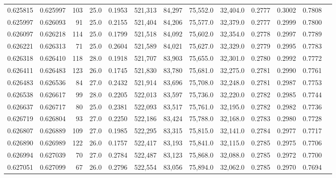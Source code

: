 \begin{tabular}{rrrrrrrrrrrrr}
0.625815 & 0.625997 &   103 & 25.0 &                                     0.1953 & 521,313 &  84,297 &  75,552.0 &  32,404.0 & 0.2777 & 0.3002 & 0.7808 \\
0.625997 & 0.626093 &    91 & 25.0 &                                     0.2155 & 521,404 &  84,206 &  75,577.0 &  32,379.0 & 0.2777 & 0.2999 & 0.7800 \\
0.626097 & 0.626218 &   114 & 25.0 &                                     0.1799 & 521,518 &  84,092 &  75,602.0 &  32,354.0 & 0.2778 & 0.2997 & 0.7789 \\
0.626221 & 0.626313 &    71 & 25.0 &                                     0.2604 & 521,589 &  84,021 &  75,627.0 &  32,329.0 & 0.2779 & 0.2995 & 0.7783 \\
0.626318 & 0.626410 &   118 & 28.0 &                                     0.1918 & 521,707 &  83,903 &  75,655.0 &  32,301.0 & 0.2780 & 0.2992 & 0.7772 \\
0.626411 & 0.626483 &   123 & 26.0 &                                     0.1745 & 521,830 &  83,780 &  75,681.0 &  32,275.0 & 0.2781 & 0.2990 & 0.7761 \\
0.626483 & 0.626536 &    84 & 27.0 &                                     0.2432 & 521,914 &  83,696 &  75,708.0 &  32,248.0 & 0.2781 & 0.2987 & 0.7753 \\
0.626538 & 0.626617 &    99 & 28.0 &                                     0.2205 & 522,013 &  83,597 &  75,736.0 &  32,220.0 & 0.2782 & 0.2985 & 0.7744 \\
0.626637 & 0.626717 &    80 & 25.0 &                                     0.2381 & 522,093 &  83,517 &  75,761.0 &  32,195.0 & 0.2782 & 0.2982 & 0.7736 \\
0.626719 & 0.626804 &    93 & 27.0 &                                     0.2250 & 522,186 &  83,424 &  75,788.0 &  32,168.0 & 0.2783 & 0.2980 & 0.7728 \\
0.626807 & 0.626889 &   109 & 27.0 &                                     0.1985 & 522,295 &  83,315 &  75,815.0 &  32,141.0 & 0.2784 & 0.2977 & 0.7717 \\
0.626890 & 0.626989 &   122 & 26.0 &                                     0.1757 & 522,417 &  83,193 &  75,841.0 &  32,115.0 & 0.2785 & 0.2975 & 0.7706 \\
0.626994 & 0.627039 &    70 & 27.0 &                                     0.2784 & 522,487 &  83,123 &  75,868.0 &  32,088.0 & 0.2785 & 0.2972 & 0.7700 \\
0.627051 & 0.627099 &    67 & 26.0 &                                     0.2796 & 522,554 &  83,056 &  75,894.0 &  32,062.0 & 0.2785 & 0.2970 & 0.7694 \\

\end{tabular}

